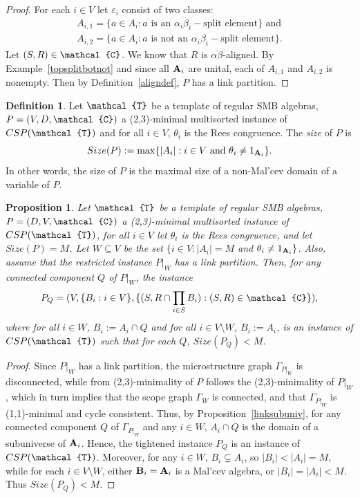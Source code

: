 \documentclass[11pt]{amsart}
\newcommand{\m}[1]{{\uppercase {\mathbf {#1}}}}
\newcommand{\vr}[1]{{\uppercase {\mathcal{#1}}}}
\newtheorem{prp}[thm]{Proposition}
\theoremstyle{definition}
\newtheorem{df}[thm]{Definition}
\begin{document}
\begin{proof}
For each $i\in V$ let $\varepsilon_i$ consist of two classes: 
\[
\begin{gathered}
A_{i,1}=\{a\in A_i:a\text{ is an }\alpha_i\beta_i-\text{split element}\}\text{ and}\\
A_{i,2}=\{a\in A_i:a\text{ is not an }\alpha_i\beta_i-\text{split element}\}.
\end{gathered}
\] 
Let $(S,R)\in \vr c$. We know that $R$ is $\overline{\alpha\beta}$-aligned. By Example~\ref{topsplitbotnot} and since all $\m a_i$ are unital, each of $A_{i,1}$ and $A_{i,2}$ is nonempty. Then by Definition~\ref{aligndef}, $P$ has a link partition.
\end{proof}

\begin{df}\label{sizedef}
Let $\vr t$ be a template of regular SMB algebras, $P=(V,D,\vr c)$ a (2,3)-minimal multisorted instance of $CSP(\vr t)$ and for all $i\in V$, $\theta_i$ is the Rees congruence. The {\em size} of $P$ is\[Size(P):=\max\{|A_i|:i\in V\text{ and }\theta_i\neq 1_{\m a_i}\}.\]
In other words, the size of $P$ is the maximal size of a non-Mal'cev domain of a variable of $P$.
\end{df}

\begin{prp}\label{linkmax}
Let $\vr t$ be a template of regular SMB algebras, $P=(D,V,\vr c)$ a (2,3)-minimal multisorted instance of $CSP(\vr t)$, for all $i\in V$ let $\theta_i$ is the Rees congruence, and let $Size(P)=M$. Let $W\subseteq V$ be the set $\{i\in V:|A_i|=M$ and $\theta_i\neq 1_{\m A_i}\}$. Also, assume that the restricted instance $P|_W$ has a link partition. Then, for any connected component $Q$ of $P|_{W}$, the instance 
$$P_Q=(V,\{B_i:i\in V\},\{(S,R\cap\prod\limits_{i\in S}B_i):(S,R)\in \vr c\}),$$ 
where for all $i\in W$, $B_i:=A_i\cap Q$ and for all $i\in V\setminus W$, $B_i:=A_i$, is an instance of $CSP(\vr t)$ such that for each $Q$, $Size(P_Q)<M$.
\end{prp}

\begin{proof}
Since $P|_W$ has a link partition, the microstructure graph $\Gamma_{P|_W}$ is disconnected, while from (2,3)-minimality of $P$ follows the (2,3)-minimality of $P|_W$, which in turn implies that the scope graph $\Gamma_W$ is connected, and that $\Gamma_{P|_W}$ is (1,1)-minimal and cycle consistent. Thus, by Proposition~\ref{linksubuniv}, for any connected component $Q$ of $\Gamma_{P|_W}$ and any $i\in W$, $A_i\cap Q$ is the domain of a subuniverse of $\m a_i$. Hence, the tightened instance $P_Q$ is an instance of $CSP(\vr t)$. Moreover, for any $i\in W$, $B_i\subsetneq A_i$, so $|B_i|<|A_i|=M$, while for each $i\in V\setminus W$, either $\m B_i=\m A_i$ is a Mal'cev algebra, or $|B_i|=|A_i|<M$. Thus $Size(P_Q)<M$.
\end{proof}
\end{document}

